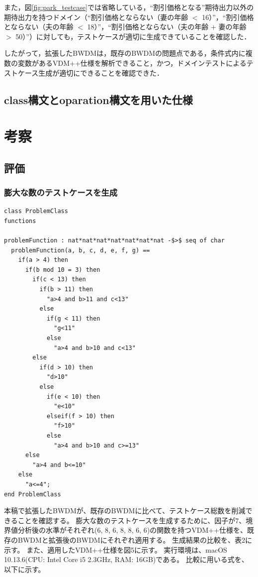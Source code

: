 \documentclass[uplatex, report, a4j, 10pt]{jsbook}
\begin{document}
また，図\ref{fig:park_testcase}では省略している，“割引価格となる”期待出力以外の期待出力を持つドメイン（“割引価格とならない（妻の年齢 $<$ 16）”，“割引価格とならない（夫の年齢 $<$ 18）”，“割引価格とならない（夫の年齢 + 妻の年齢 $>$ 50）”）に対しても，テストケースが適切に生成できていることを確認した．

したがって，拡張したBWDMは，既存のBWDMの問題点である，条件式内に複数の変数があるVDM++仕様を解析できること，かつ，ドメインテストによるテストケース生成が適切にできることを確認できた．


\section{class構文とoparation構文を用いた仕様}

\chapter{考察}\label{cha:Evaluation}
\section{評価}
\subsection{膨大な数のテストケースを生成}
\lstset{language=}
\begin{lstlisting}[caption=因子が7、水準が（6 8 6 8 8 6 6）の関数を持つVDM++仕様。,label=fig:pict4javaIndication]
class ProblemClass
functions

problemFunction : nat*nat*nat*nat*nat*nat*nat -$>$ seq of char
  problemFunction(a, b, c, d, e, f, g) ==
    if(a > 4) then
      if(b mod 10 = 3) then
        if(c < 13) then
          if(b > 11) then
            "a>4 and b>11 and c<13"
          else
            if(g < 11) then
              "g<11"
            else
              "a>4 and b>10 and c<13"
        else
          if(d > 10) then
            "d>10"
          else
            if(e < 10) then
              "e<10"
            elseif(f > 10) then
              "f>10"
            else
              "a>4 and b>10 and c>=13"
      else
        "a>4 and b<=10"
    else
      "a<=4";
end ProblemClass
\end{lstlisting}

本稿で拡張したBWDMが、既存のBWDMに比べて、テストケース総数を削減できることを確認する。
膨大な数のテストケースを生成するために、因子が7、境界値分析後の水準がそれぞれ(6, 8, 6, 8, 8, 6, 6)の関数を持つVDM++仕様を、既存のBWDMと拡張後のBWDMにそれぞれ適用する。
生成結果の比較を、表2に示す。
また、適用したVDM++仕様を図5に示す。
実行環境は、macOS 10.13.6(CPU: Intel Core i5 2.3GHz, RAM: 16GB)である。
比較に用いる式を、以下に示す。
\end{document}
